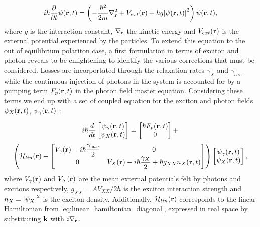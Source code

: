 \begin{equation}
     i\hbar \dfrac{\partial}{\partial t} \psi(\mathbf{r}, t) = \left( -\dfrac{\hbar^2}{2 m}\nabla_{\mathbf{r}}^2 + V_{ext}(\mathbf{r}) + \hbar g \abs{\psi(\mathbf{r}, t)}^2 \right) \psi(\mathbf{r}, t),
\label{GPE}
\end{equation}
where $g$ is the interaction constant, $\nabla_{\mathbf{r}}$ the kinetic energy and $V_{ext}(\mathbf{r})$ is the external potential experienced by the particles. To extend this equation to the out of equilibrium polariton case, a first formulation in 
terms of exciton and photon reveals to be enlightening to identify the various corrections that must be considered.
Losses are incorportated through the relaxation rates $\gamma_X$ and $\gamma_{cav}$ while the continuous injection of photons in the system is accounted for by a pumping term $F_p(\mathbf{r},t)$ in the photon field master equation.
Considering these terms we end up with a set of coupled equation for the exciton and photon fields $\psi_X(\mathbf{r},t)$, $\psi_{\gamma}(\mathbf{r},t)$ :

\begin{equation}
    i\hbar \dfrac{d}{dt}
    \begin{bmatrix}
    \psi_{\gamma}(\mathbf{r}, t) \\
    \psi_{X}(\mathbf{r}, t)
    \end{bmatrix} 
    = 
    \begin{bmatrix}
    \hbar F_p(\mathbf{r}, t) \\
    0
    \end{bmatrix} +
\label{Schrödinger_uncoupled}
\end{equation}
\begin{align*}
    \left( \mathcal{H}_{lin}(\mathbf{r}) + 
    \begin{bmatrix}
    V_\gamma(\mathbf{r}) - i\hbar \dfrac{\gamma_{cav}}{2} & 0\\
    0 & V_X(\mathbf{r}) - i\hbar \dfrac{\gamma_{X}}{2} + \hbar g_{XX} n_{X}(\mathbf{r}, t)
    \end{bmatrix}
    \right)
    \begin{bmatrix}
    \psi_{\gamma}(\mathbf{r}, t) \\
    \psi_{X}(\mathbf{r}, t)
    \end{bmatrix},
\end{align*}    
where $V_\gamma(\mathbf{r})$ and $V_X(\mathbf{r})$ are the mean external potentials felt by photons and excitons respectively, $g_{XX} = A V_{XX}/2\hbar$ is the exciton interaction strength and $n_X = \abs{\psi_{X}}^2$ is the exciton density.  Additionally, $\mathcal{H}_{lin}(\mathbf{r})$ corresponds to the linear Hamiltonian from \autoref{eq:linear_hamiltonian_diagonal}, expressed in real space by substituting $\mathbf{k}$ with $i \nabla_{\mathbf{r}}$.

